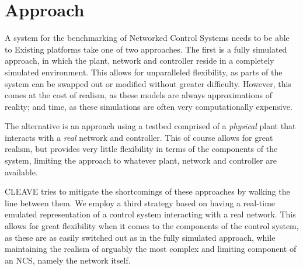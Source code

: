 \pagebreak
\section{Approach}

A system for the benchmarking of Networked Control Systems needs to be able to 
Existing platforms take one of two approaches.
The first is a fully simulated approach, in which the plant, network and controller reside in a completely simulated environment.
This allows for unparalleled flexibility, as parts of the system can be swapped out or modified without greater difficulty.
However, this comes at the cost of realism, as these models are always approximations of reality; and time, as these simulations are often very computationally expensive.

The alternative is an approach using a testbed comprised of a \emph{physical} plant that interacts with a \emph{real} network and controller.
This of course allows for great realism, but provides very little flexibility in terms of the components of the system, limiting the approach to whatever plant, network and controller are available.

CLEAVE tries to mitigate the shortcomings of these approaches by walking the line between them.
We employ a third strategy based on having a real-time emulated representation of a control system interacting with a real network.
This allows for great flexibility when it comes to the components of the control system, as these are as easily switched out as in the fully simulated approach, while maintaining the realism of arguably the most complex and limiting component of an NCS, namely the network itself.

